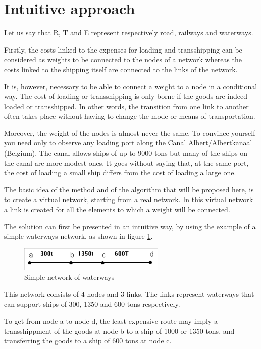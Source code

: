 \section{Intuitive approach}


Let us say that R, T and E represent respectively road, railways and waterways.

Firstly, the costs linked to the expenses for loading and transshipping can be
considered as weights to be connected to the nodes of a network whereas the
costs linked to the shipping itself are connected to the links of the
network.

It is, however, necessary to be able to connect a weight to a node in a
conditional way.  The cost of loading or transshipping is only borne if the
goods are indeed loaded or transshipped.  In other words, the transition from
one link to another often takes place without having to change the mode or means
of transportation.

Moreover, the weight of the nodes is almost never the same.  To convince
yourself you need only to observe any loading port along the Canal
Albert/Albertkanaal (Belgium). The canal allows ships of up to 9000 tons but
many of the ships on the canal are more modest ones.  It goes without saying
that, at the same port, the cost of loading a small ship differs from the cost
of loading a large one.

The basic idea of the method and of the algorithm that will be proposed here, is to
create a virtual network, starting from a real network. In this virtual network
a link is created for all the elements to which a weight will be connected.

The solution can first be presented in an intuitive way, by using the example of
a simple waterways network, as shown in figure \ref{f3_1}.


\begin{figure}[htbp]
\centerline{\includegraphics[width=7cm]{f3_1.png}}
\caption{\label{f3_1} Simple network of waterways}
\end{figure}

This network consists of 4 nodes and 3 links.  The links represent waterways
that can support ships of 300, 1350 and 600 tons respectively.

To get from node a to node d, the least expensive route may imply a transshippment
of the goods at node b to a ship of 1000 or 1350 tons, and transferring the goods
to a ship of 600 tons at node c.


